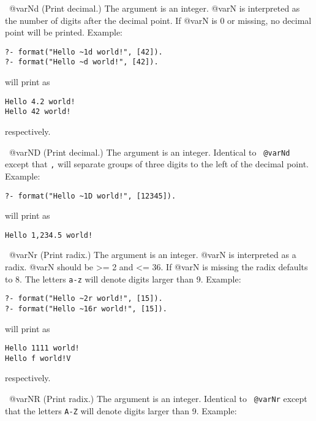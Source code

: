 \begin{description}
\begin{itemize}
{\item ~@var{N}d
(Print decimal.) The argument is an integer. @var{N} is interpreted as the
number of digits after the decimal point.  If @var{N} is 0 or missing, no
decimal point will be printed.  Example:  

\begin{verbatim}
?- format("Hello ~1d world!", [42]).
?- format("Hello ~d world!", [42]).
\end{verbatim}

\noindent
will print as

\begin{verbatim}
Hello 4.2 world!
Hello 42 world!
\end{verbatim}

\noindent
respectively.

\item ~@var{N}D
(Print decimal.) The argument is an integer.  Identical to {\tt ~@var{N}d}
except that {\tt ,} will separate groups of three digits to the left of the
decimal point.  Example:  

\begin{verbatim}
?- format("Hello ~1D world!", [12345]).
\end{verbatim}

\noindent
will print as

\begin{verbatim}
Hello 1,234.5 world!
\end{verbatim}

\item ~@var{N}r
(Print radix.) The argument is an integer. @var{N} is interpreted as a radix.
@var{N} should be >= 2 and <= 36.  If @var{N} is missing the radix defaults to
8.  The letters {\tt a-z} will denote digits larger than 9.  Example:  

\begin{verbatim}
?- format("Hello ~2r world!", [15]).
?- format("Hello ~16r world!", [15]).
\end{verbatim}

\noindent
will print as

\begin{verbatim}
Hello 1111 world!
Hello f world!V
\end{verbatim}

\noindent
respectively.

\item ~@var{N}R
(Print radix.) The argument is an integer.  Identical to {\tt ~@var{N}r} except
that the letters {\tt A-Z} will denote digits larger than 9.  Example:  

}
\end{itemize}
\end{description}
